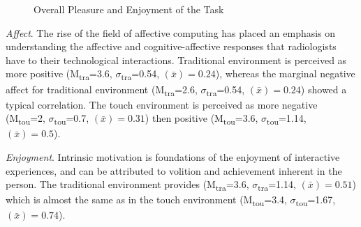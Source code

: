 \documentclass{chi-ext}
\begin{document}
\begin{figure}
\caption{Overall Pleasure and Enjoyment of the Task}
\label{fig:Fig11}
\end{figure}

\textit{Affect}. The rise of the field of affective computing has placed an emphasis on understanding the affective and cognitive-affective responses that radiologists have to their technological interactions. Traditional environment is perceived as more positive (M\textsubscript{tra}=3.6, $\sigma$\textsubscript{tra}=0.54, {}$\left({\bar x}\right)=0.24$), whereas the marginal negative affect for traditional environment (M\textsubscript{tra}=2.6, $\sigma$\textsubscript{tra}=0.54, {}$\left({\bar x}\right)=0.24$) showed a typical correlation. The touch environment is perceived as more negative (M\textsubscript{tou}=2, $\sigma$\textsubscript{tou}=0.7, {}$\left({\bar x}\right)=0.31$) then positive (M\textsubscript{tou}=3.6, $\sigma$\textsubscript{tou}=1.14, {}$\left({\bar x}\right)=0.5$).

\textit{Enjoyment}. Intrinsic motivation is foundations of the enjoyment of interactive experiences, and can be attributed to volition and achievement inherent in the person. The traditional environment provides (M\textsubscript{tra}=3.6, $\sigma$\textsubscript{tra}=1.14, {}$\left({\bar x}\right)=0.51$) which is almost the same as in the touch environment (M\textsubscript{tou}=3.4, $\sigma$\textsubscript{tou}=1.67, {}$\left({\bar x}\right)=0.74$).
\end{document}
